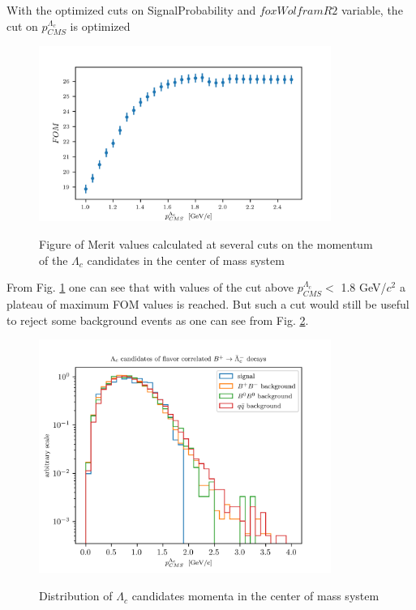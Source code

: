 With the optimized cuts on SignalProbability and $foxWolframR2$ variable, the cut on $p^{\Lambda_c}_{CMS}$ is optimized\\
\vspace{0.2 cm}
\newpage


\begin{figure}[h!]
{\includegraphics[width=0.85\textwidth]{04-chargedCorrBtoLambda/figs/corr_chargedB_FOMvsCMS_Pcut.png}}
\caption{Figure of Merit values calculated at several cuts on the momentum of the $\Lambda_c$ candidates in the center of mass system}
\label{fig:corr_chargedB_FOMvsCMS_Pcut}
\end{figure}
From Fig. \ref{fig:corr_chargedB_FOMvsCMS_Pcut} one can see that with values of the cut above $p^{\Lambda_c}_{CMS} <$ 1.8 GeV/$c^2$ a plateau of maximum FOM values is reached. But such a cut would still be useful to reject some background events as one can see from Fig. \ref{fig:LogPlotchargedBcorr_Lambda_c_CMS_P_optimisedSigProb_R}. 

\newpage

\begin{figure}[h!]
{\includegraphics[width=0.85\textwidth]{04-chargedCorrBtoLambda/figs/LogPlotchargedBcorr_Lambda_c_CMS_P_optimisedSigProb_R.png}}
\caption{Distribution of  $\Lambda_c$ candidates momenta in the center of mass system}
\label{fig:LogPlotchargedBcorr_Lambda_c_CMS_P_optimisedSigProb_R}
\end{figure}

